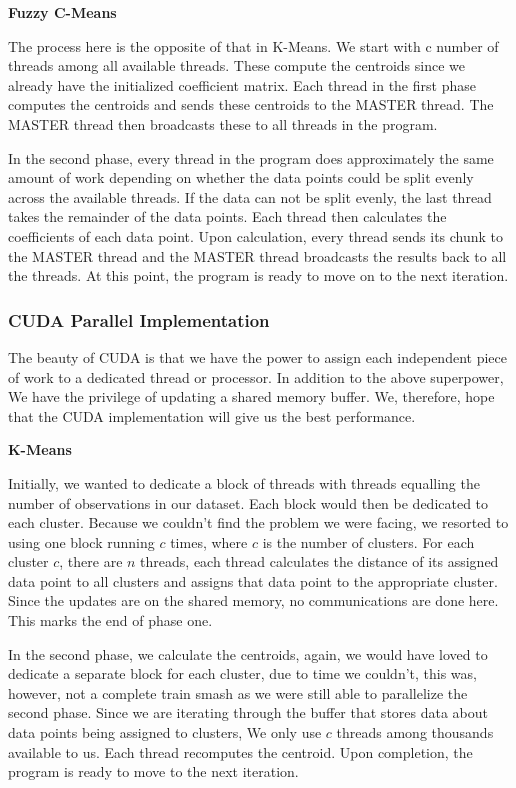 \begin{multicols*}{2}
    \textbf{Fuzzy C-Means}

    The process here is the opposite of that in K-Means. We start with c number of threads among all available threads. These compute the centroids since we already have the initialized coefficient matrix. Each thread in the first phase computes the centroids and sends these centroids to the MASTER thread. The MASTER thread then broadcasts these to all threads in the program. 

    In the second phase, every thread in the program does approximately the same amount of work depending on whether the data points could be split evenly across the available threads. If the data can not be split evenly, the last thread takes the remainder of the data points.  Each thread then calculates the coefficients of each data point. Upon calculation, every thread sends its chunk to the MASTER thread and the MASTER thread broadcasts the results back to all the threads. At this point, the program is ready to move on to the next iteration.

    \subsubsection{CUDA Parallel Implementation}
    The beauty of CUDA is that we have the power to assign each independent piece of work to a dedicated thread or processor. In addition to the above superpower, We have the privilege of updating a shared memory buffer. We, therefore, hope that the CUDA implementation will give us the best performance.

    \textbf{K-Means}
    
    Initially, we wanted to dedicate a block of threads with threads equalling the number of observations in our dataset. Each block would then be dedicated to each cluster. Because we couldn't find the problem we were facing, we resorted to using one block running $c$ times, where $c$ is the number of clusters. For each cluster  $c$,  there are $n$ threads, each thread calculates the distance of its assigned data point to all clusters and assigns that data point to the appropriate cluster. Since the updates are on the shared memory, no communications are done here. This marks the end of phase one.

    In the second phase, we calculate the centroids, again, we would have loved to dedicate a separate block for each cluster, due to time we couldn't, this was, however, not a complete train smash as we were still able to parallelize the second phase. Since we are iterating through the buffer that stores data about data points being assigned to clusters, We only use $c$ threads among thousands available to us. Each thread recomputes the centroid. Upon completion, the program is ready to move to the next iteration.


\end{multicols*}

